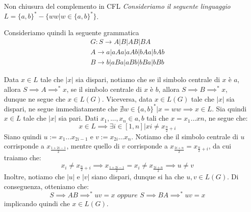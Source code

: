 \begin{Example}{Non chiusura del complemento in CFL}{}
\textit{Consideriamo il seguente linguaggio $L = \{a, b\}^* - \{ww | w \in \{a, b\}^*\}$}.

Consideriamo quindi la seguente grammatica 
\begin{gather*}
G : S \to A | B | AB | BA\\
A \to a | aAa | aAb | bAa | bAb\\
B \to b | aBa | aBb | bBa | bBb
\end{gather*}

Data $x \in L$ tale che $|x|$ sia dispari, notiamo che se il simbolo centrale di $x$ è $a$, allora $S \implies A \implies^* x$, se il simbolo centrale di $x$ è $b$, allora $S \implies B
\implies^* x$, dunque ne segue che $x \in L(G)$.
Viceversa, data $x \in L(G)$ tale che $|x|$ sia dispari, ne segue immediatamente che $\nexists w \in \{a, b\}^* | x = ww \implies x \in L$. Sia quindi $x \in L$ tale che $|x|$ sia pari.
Dati $x_1,..., x_n \in {a, b}$ tali che $x = x_1...xn$, ne segue che:
\begin{equation*}
    x \in L \implies \exists i \in [1, n] | xi\neq x_{\frac{n}{2}+i}
\end{equation*}
Siano quindi $u := x_1 . . . x_{2i-1}$ e $v := x_{2i}...x_n$. Notiamo che il simbolo centrale di
$u$ corrisponde a $x_{\frac{1+2i-1}{2}}$, mentre quello di $v$ corrisponde a $x_{\frac{2i+n}{2}}=x_{\frac{n}{2}+i}$, da cui traiamo che:
\begin{equation*}
    x_i\neq x_{\frac{n}{2}+i}\implies x_{\frac{1+2i-1}{2}}=x_i\neq x_{\frac{2i+n}{2}}\implies u\neq v    
\end{equation*}
Inoltre, notiamo che $|u|$ e $|v|$ siano dispari, dunque si ha che $u, v \in L(G)$. Di
conseguenza, otteniamo che:
\begin{equation*}
    S \implies AB\implies^* uv = x \textit{ oppure } S \implies BA \implies^* uv = x    
\end{equation*}
implicando quindi che $x \in L(G)$.


\end{Example}
